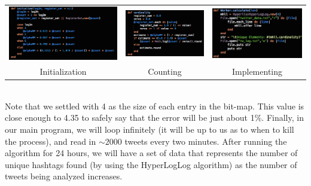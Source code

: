\documentclass{article}
\begin{document}
\clearpage
\begin{center}
\begin{tabular}{c c c}
\includegraphics[scale=0.3]{twitter_problem/hll_init}
&
\includegraphics[scale=0.4]{twitter_problem/hll_count}
&
\includegraphics[scale=0.4]{twitter_problem/hll_imp}
\\
Initialization & Counting & Implementing
\end{tabular}
\end{center}
\noindent \\
Note that we settled with 4 as the size of each entry in the bit-map. This value is close enough to 4.35 to safely say that the error will be just about 1\%.
Finally, in our main program, we will loop infinitely (it will be up to us as to when to kill the process), and read in $\sim 2000$ tweets every two minutes. 
After running the algorithm for 24 hours, we will have a set of data that represents the number of unique hashtags found (by using the HyperLogLog algorithm) as the number of tweets being analyzed increases.
\end{document}
